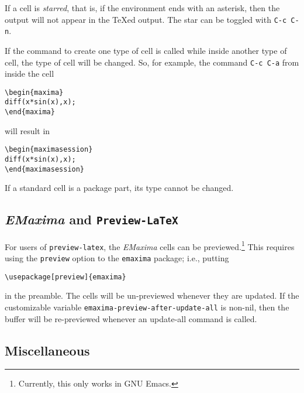 \documentclass{article}
\newcommand{\emx}{\textsl{\sffamily EMaxima}}
\newcommand{\hyph}{-\hspace{0pt}}
\begin{document}

If a cell is \emph{starred}, that is, if the environment ends with an
asterisk, then the output will not appear in the \TeX{}ed output.
The star can be toggled with \texttt{C-c C-n}.

If the command to create one type of cell is called while inside
another type of cell, the type of cell will be changed.  So, for
example, the command \texttt{C-c C-a} from inside the cell
\begin{verbatim}
\begin{maxima}
diff(x*sin(x),x);
\end{maxima}
\end{verbatim}
\noindent
will result in
\begin{verbatim}
\begin{maximasession}
diff(x*sin(x),x);
\end{maximasession}
\end{verbatim}
\noindent
If a standard cell is a package part, its type cannot be changed.

\subsection{\emx{} and \texttt{Preview-LaTeX}}

For users of \texttt{preview-latex}, the \emx{} cells can be
previewed.\footnote{Currently, this only works in GNU Emacs.}
This requires using the \texttt{preview} option to the
\texttt{emaxima} package; i.e., putting
\begin{verbatim}
\usepackage[preview]{emaxima}
\end{verbatim}
in the preamble.  
The cells will be un-previewed whenever they are updated.
If the customizable variable \texttt{emaxima\hyph{}preview\hyph{}after\hyph{}update\hyph{}all}
is non-nil, then the buffer will be re-previewed whenever an
update-all command is called.


\subsection{Miscellaneous}
\end{document}
